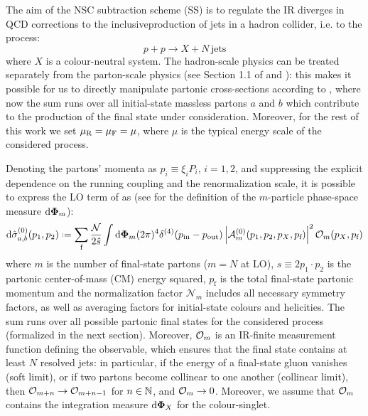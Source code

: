 
The aim of the NSC subtraction scheme (SS) is to regulate the IR diverges in QCD corrections to the inclusive\footnotemark production of jets in a hadron collider, i.e. to the process:
\begin{equation}
  p + p \rightarrow X + N \,\text{jets}
\end{equation}
where $ X $ is a colour-neutral system. The hadron-scale physics can be treated separately from the parton-scale physics (see Section 1.1 of \cite{Collins-2011} and ): this makes it possible for us to directly manipulate partonic cross-sections according to , where now the sum runs over all initial-state massless partons $ a $ and $ b $ which contribute to the production of the final state under consideration. Moreover, for the rest of this work we set $ \mu_\text{R} = \mu_\text{F} = \mu $, where $ \mu $ is the typical energy scale of the considered process.


Denoting the partons' momenta as $ p_i \equiv \xi_i P_i $, $ i = 1,2 $, and suppressing the explicit dependence on the running coupling and the renormalization scale, it is possible to express the LO term of  as (see  for the definition of the $ m $-particle phase-space measure $ \mathrm{d} \boldsymbol{\Phi}_m $):
\begin{equation}
  \dd\pcs_{a,b}^{(0)}(p_1 , p_2) \defeq \sum_\text{f} \frac{\mathcal{N}}{2\hat{s}} \int \lps_m (2\pi)^4 \delta^{(4)}(p_\text{in} - p_\text{out}) \abs{\ampl^{(0)}_m(p_1, p_2, p_X, p_\text{f})}^2 \op_m(p_X, p_\text{f})
  \label{eq:ds-lo}
\end{equation}
where $ m $ is the number of final-state partons ($ m = N $ at LO), $ \hat{s} \equiv 2 p_1 \cdot p_2 $ is the partonic center-of-mass (CM) energy squared, $ p_\text{f} $ is the total final-state partonic momentum and the normalization factor $ \mathcal{N}_m $ includes all necessary symmetry factors, as well as averaging factors for initial-state colours and helicities. The sum runs over all possible partonic final states for the considered process (formalized in the next section). Moreover, $ \mathcal{O}_m $ is an IR-finite measurement function defining the observable, which ensures that the final state contains at least $ N $ resolved jets: in particular, if the energy of a final-state gluon vanishes (soft limit), or if two partons become collinear to one another (collinear limit), then $ \mathcal{O}_{m + n} \rightarrow \mathcal{O}_{m + n - 1} $ for $ n \in \mathbb{N} $, and $ \mathcal{O}_m \rightarrow 0 $. Moreover, we assume that $ \mathcal{O}_m $ contains the integration measure $ \mathrm{d} \boldsymbol{\Phi}_X $ for the colour-singlet.

